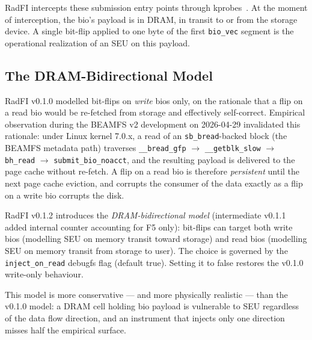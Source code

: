 RadFI intercepts these submission entry points through
kprobes~\cite{corbet2017kprobes,kernel-kprobes}. At the moment of
interception, the bio's payload is in DRAM, in transit to or from
the storage device. A single bit-flip applied to one byte of the
first \texttt{bio\_vec} segment is the operational realization of an
SEU on this payload.

\subsection{The DRAM-Bidirectional Model}\label{ssec:dram-bidir}

RadFI v0.1.0 modelled bit-flips on \emph{write} bios only, on the
rationale that a flip on a read bio would be re-fetched from storage
and effectively self-correct. Empirical observation during the
BEAMFS v2 development on 2026-04-29 invalidated this rationale:
under Linux kernel 7.0.x, a read of an \texttt{sb\_bread}-backed
block (the BEAMFS metadata path) traverses
\texttt{\_\_bread\_gfp} \(\to\) \texttt{\_\_getblk\_slow} \(\to\)
\texttt{bh\_read} \(\to\) \texttt{submit\_bio\_noacct}, and the
resulting payload is delivered to the page cache without re-fetch. A
flip on a read bio is therefore \emph{persistent} until the next
page cache eviction, and corrupts the consumer of the data exactly
as a flip on a write bio corrupts the disk.

RadFI v0.1.2 introduces the \emph{DRAM-bidirectional model}
(intermediate v0.1.1 added internal counter accounting for F5 only):
bit-flips can target both write bios (modelling SEU on memory
transit toward storage) and read bios (modelling SEU on memory
transit from storage to user). The choice is governed by the
\texttt{inject\_on\_read} debugfs flag (default true). Setting it to
false restores the v0.1.0 write-only behaviour.

This model is more conservative --- and more physically realistic
--- than the v0.1.0 model: a DRAM cell holding bio payload is
vulnerable to SEU regardless of the data flow direction, and an
instrument that injects only one direction misses half the empirical
surface.
